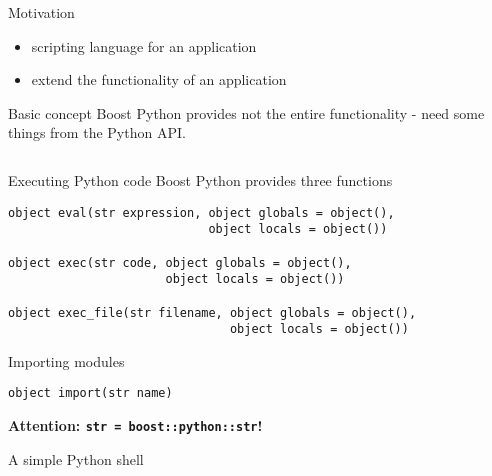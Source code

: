 
\begin{frame}[fragile]{Motivation}
    \begin{itemize}
        \setlength{\itemsep}{0.1\textheight}
        \item scripting language for an application
        \item extend the functionality of an application
    \end{itemize}
\end{frame}

\begin{frame}[fragile]{Basic concept}
Boost Python provides not the entire functionality - need some things from the 
Python API.
\vspace{0.1\textheight}
\inputminted[fontsize=\tiny]{cpp}{../src/embedding/src/main.cpp}
\end{frame}

\begin{frame}[fragile]{Executing Python code}
    Boost Python provides three functions
    \vspace{0.025\textheight}
    \begin{verbatim} 
object eval(str expression, object globals = object(), 
                            object locals = object())

object exec(str code, object globals = object(), 
                      object locals = object())

object exec_file(str filename, object globals = object(), 
                               object locals = object())
    \end{verbatim}
    \vspace{0.05\textheight}
    Importing modules
    \vspace{0.025\textheight}
    \begin{verbatim}
object import(str name)
    \end{verbatim}
    \vspace{0.05\textheight}
    \textbf{Attention: \texttt{str = boost::python::str}!}
\end{frame}

\begin{frame}[fragile]{A simple Python shell}
\inputminted[fontsize=\tiny]{cpp}{../src/embedding/src/pyshell2.cpp}
\end{frame}
